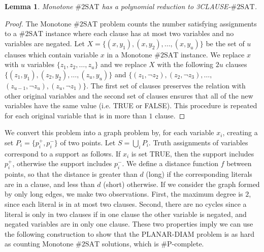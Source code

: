 \documentclass{journal}
\newcommand{\pset}{support\xspace}
\newcommand{\PDIAM}{$\ensuremath{\textrm{PLANAR-DIAM}}$\xspace}
\newcommand{\twoSAT}{$\ensuremath{\textrm{\#2SAT}}$\xspace}
\newtheorem {lemma}[theorem]{Lemma}
\begin{document}
\begin {lemma}
\label{lem:3CLAUSE-2SAT}
Monotone \twoSAT has a polynomial reduction to 3CLAUSE-\twoSAT.
\end {lemma}
\begin{proof}
The Monotone \twoSAT problem counts the number satisfying assignments to a \twoSAT instance where each clause has at most two variables and no variables are negated.  
Let $X = \{(x, y_1), (x, y_2), \ldots, (x, y_u)\}$ be the set of $u$ clauses which contain variable $x$ in a Monotone \twoSAT instance.  We replace $x$ with $u$ variables $\{z_1, z_2, \ldots, z_u\}$ and we replace $X$ with the following $2u$ clauses $\{(z_1, y_1), (z_2, y_2), \ldots, (z_u, y_u)\}$ and $\{(z_1, \neg z_2), (z_2, \neg z_3), \ldots,$ $(z_{u-1}, \neg z_u), (z_u, \neg z_1)\}$.
The first set of clauses preserves the relation with other original variables and the second set of clauses ensures that all of the new variables have the same value (i.e. \textsf{TRUE} or \textsf{FALSE}).
This procedure is repeated for each original variable that is in more than $1$ clause.
\end{proof}

We convert this problem into a graph problem by, for each variable $x_i$, creating a set $P_i = \{p_i^+, p_i^-\}$ of two points.  Let $S = \bigcup_i P_i$.  Truth assignments of variables correspond to a \pset as follows.  If $x_i$ is set \textsf{TRUE}, then the \pset includes $p_i^+$, otherwise the \pset includes $p_i^-$.  We define a distance function $f$ between points, so that the distance is greater than $d$ (long) if the corresponding literals are in a clause, and less than $d$ (short) otherwise.  If we consider the graph formed by only long edges, we make two observations.
First, the maximum degree is $2$, since each literal is in at most two clauses.
Second, there are no cycles since a literal is only in two clauses if in one clause the other variable is negated, and negated variables are in only one clause.
These two properties imply we can use the following construction to show that the \PDIAM problem is as hard as counting Monotone \twoSAT solutions, which is \#P-complete.
\end{document}
